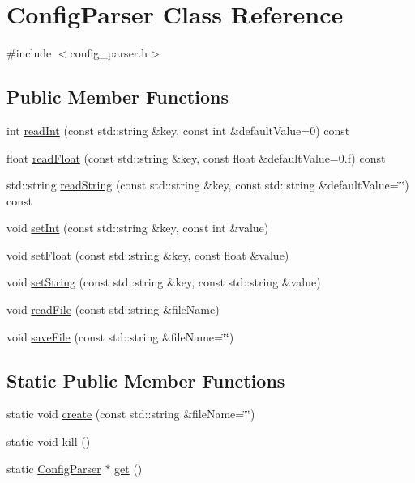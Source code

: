 \hypertarget{class_config_parser}{\section{Config\-Parser Class Reference}
\label{class_config_parser}
}


{\ttfamily \#include $<$config\-\_\-parser.\-h$>$}

\subsection*{Public Member Functions}
\begin{DoxyCompactItemize}
\item 
int \hyperlink{class_config_parser_a9eb8031a0252a34fcb808dba2b9780e5}{read\-Int} (const std\-::string \&key, const int \&default\-Value=0) const 
\item 
float \hyperlink{class_config_parser_a7a4b723bc0f88e966f4b67347b5264cd}{read\-Float} (const std\-::string \&key, const float \&default\-Value=0.f) const 
\item 
std\-::string \hyperlink{class_config_parser_abcdb07fdc295e07adefbd338c552c493}{read\-String} (const std\-::string \&key, const std\-::string \&default\-Value=\char`\"{}\char`\"{}) const 
\item 
void \hyperlink{class_config_parser_a49ddd20e2f9ea0ea864c3006d2177323}{set\-Int} (const std\-::string \&key, const int \&value)
\item 
void \hyperlink{class_config_parser_a18ad19fa692a557be50d868fd3f83ca3}{set\-Float} (const std\-::string \&key, const float \&value)
\item 
void \hyperlink{class_config_parser_a6eba995aa9d58ad843d05e3f0a003d3e}{set\-String} (const std\-::string \&key, const std\-::string \&value)
\item 
void \hyperlink{class_config_parser_adcaa724f20085403bb1beb7918903fdd}{read\-File} (const std\-::string \&file\-Name)
\item 
void \hyperlink{class_config_parser_a98928657410a8c91f9d68c5d5235ace1}{save\-File} (const std\-::string \&file\-Name=\char`\"{}\char`\"{})
\end{DoxyCompactItemize}
\subsection*{Static Public Member Functions}
\begin{DoxyCompactItemize}
\item 
static void \hyperlink{class_config_parser_a7525ed2717618bab9644cec9cb77bbdd}{create} (const std\-::string \&file\-Name=\char`\"{}\char`\"{})
\item 
static void \hyperlink{class_config_parser_a2c271ec9f6b7f5182c6781a56514f1ef}{kill} ()
\item 
static \hyperlink{class_config_parser}{Config\-Parser} $\ast$ \hyperlink{class_config_parser_a3d3cbdae938afd36cffd28561830d1af}{get} ()
\end{DoxyCompactItemize}


